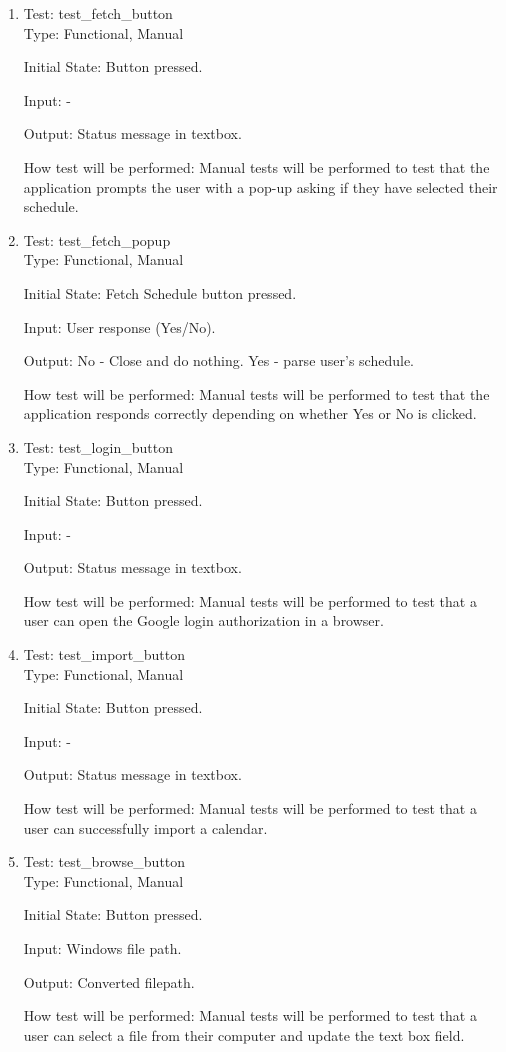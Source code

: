 \documentclass[12pt, titlepage]{article}
\begin{document}
\color{blue}
\begin{enumerate}
\item{Test: test\_fetch\_button\\}
Type: Functional, Manual
					
Initial State: Button pressed.
					
Input: -
					
Output: Status message in textbox.
					
How test will be performed: Manual tests will be performed to test that the application prompts the user with a pop-up asking if they have selected their schedule.\\

\item{Test: test\_fetch\_popup\\}
Type: Functional, Manual
					
Initial State: Fetch Schedule button pressed.
					
Input: User response (Yes/No).
					
Output: No - Close and do nothing. Yes - parse user's schedule.
					
How test will be performed: Manual tests will be performed to test that the application responds correctly depending on whether Yes or No is clicked.\\

\item{Test: test\_login\_button\\}
Type: Functional, Manual
					
Initial State: Button pressed.
					
Input: -
					
Output: Status message in textbox.
					
How test will be performed: Manual tests will be performed to test that a user can open the Google login authorization in a browser.\\

\item{Test: test\_import\_button\\}
Type: Functional, Manual
					
Initial State: Button pressed.
					
Input: -
					
Output: Status message in textbox.
					
How test will be performed: Manual tests will be performed to test that a user can successfully import a calendar.\\
\item{Test: test\_browse\_button\\}
Type: Functional, Manual
					
Initial State: Button pressed.
					
Input: Windows file path.
					
Output: Converted filepath.
					
How test will be performed: Manual tests will be performed to test that a user can select a file from their computer and update the text box field.\\

\end{enumerate}
\color{black}
\end{document}
